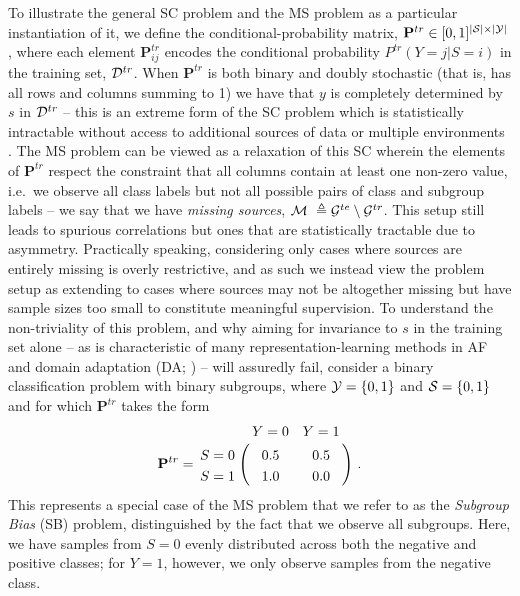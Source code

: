 To illustrate the general \ac{SC} problem and the \ac{MS} problem as a particular instantiation of
it, we define the conditional-probability matrix, \( \mathbf{P}^{tr} \in [0, 1]^{|{\mathcal{S}}| \times
|{\mathcal{Y}}|} \), where each element \( \mathbf{P}^{tr}_{ij} \) encodes the conditional probability \(
P^{tr}(Y=j|S=i) \) in the training set, \( {\mathcal{D}}^{tr} \). 
%
When \( \mathbf{P}^{tr} \) is both binary and doubly stochastic (that is, has all rows and columns
summing to 1) we have that \(y\) is completely determined by \(s\) in \( {\mathcal{D}}^{tr} \) -- this is an
extreme form of the \ac{SC} problem which is statistically intractable without access to additional
sources of data \citep{KehBarThoQua20} or multiple environments \citep{arjovsky2019invariant}. 
%
The \ac{MS} problem can be viewed as a relaxation of this \ac{SC} wherein the elements of \(
\mathbf{P}^{tr} \) respect the constraint that all columns contain at least one non-zero value,
i.e.\ we observe all class labels but not all possible pairs of class and subgroup labels -- we say
that we have \emph{missing sources}, \({\mathcal{M}}\ \triangleq {\mathcal{G}}^{te} \setminus {\mathcal{G}}^{tr}\). 
%
This setup still leads to spurious correlations but ones that are statistically tractable due to
asymmetry.
%
Practically speaking, considering only cases where sources are entirely missing is overly
restrictive, and as such we instead view the problem setup as extending to cases where sources may
not be altogether missing but have sample sizes too small to constitute meaningful supervision. 
%
To understand the non-triviality of this problem, and why aiming for invariance to \(s\) in the
training set alone -- as is characteristic of many representation-learning methods in \ac{AF}
\citep{edwards2015censoring, madras2018learning, quadrianto2019discovering}  and domain adaptation
(\ac{DA}; \citep{ganin2016domain, zhao2018adversarial, saito2018maximum, lee2019sliced}) -- will
assuredly fail, consider a binary classification problem with binary subgroups, where \({\mathcal{Y}} = \{ 0,
1 \}\) and \( {\mathcal{S}} = \{ 0, 1 \}\) and for which \( \mathbf{P}^{tr} \) takes the form
%
\begin{align}\label{ms_example}
  \mathbf{P}^{tr} = \bordermatrix{
  & Y=0 & Y=1 \cr
  S=0 & 0.5 & 0.5 \cr
  S=1 & 1.0 & 0.0}~.
\end{align}
%
This represents a special case of the \ac{MS} problem that we refer to as the \emph{Subgroup Bias}
(SB) problem, distinguished by the fact that we observe all subgroups. 
%
Here, we have samples from $S=0$ evenly distributed across both the negative and positive classes;
for $Y=1$, however, we only observe samples from the negative class. 
